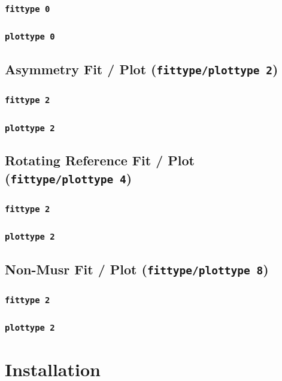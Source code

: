 \documentclass[twoside]{article}
\begin{document}
\subsubsection{\texttt{fittype 0}}\label{subsubsec:single-histo-fit}%
\subsubsection{\texttt{plottype 0}}\label{subsubsec:single-histo-plot}%

\subsection{Asymmetry Fit / Plot (\texttt{fittype/plottype 2})}\label{subsec:asymmetry-fit-plot}%
\subsubsection{\texttt{fittype 2}}\label{subsubsec:asymmetry-fit}%
\subsubsection{\texttt{plottype 2}}\label{subsubsec:asymmetry-plot}%

\subsection{Rotating Reference Fit / Plot (\texttt{fittype/plottype 4})}\label{subsec:rrf-fit-plot}%
\subsubsection{\texttt{fittype 2}}\label{subsubsec:rrf-fit}%
\subsubsection{\texttt{plottype 2}}\label{subsubsec:rrf-plot}%

\subsection{Non-Musr Fit / Plot (\texttt{fittype/plottype 8})}\label{subsec:non-musr-fit-plot}%
\subsubsection{\texttt{fittype 2}}\label{subsubsec:non-musr-fit}%
\subsubsection{\texttt{plottype 2}}\label{subsubsec:non-musr-plot}%

\appendix

\section{Installation}\label{sec:installation}%

\begin{thebibliography}{99}
\end{thebibliography}
\end{document}
